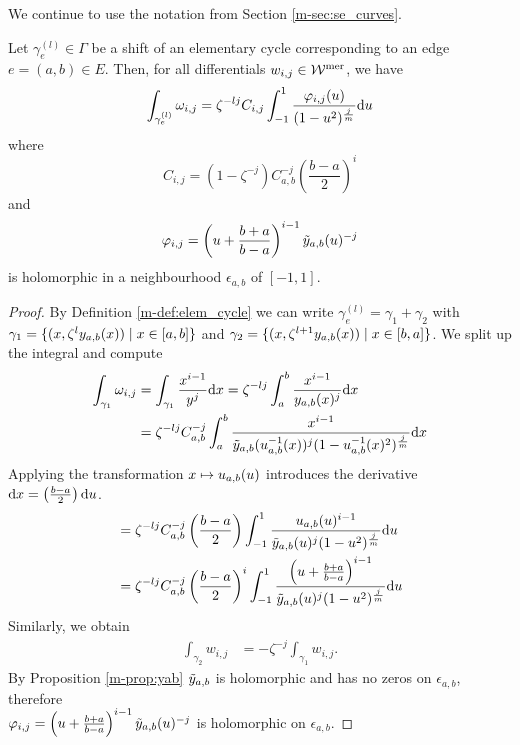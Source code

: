 \documentclass[main.tex]{subfiles}
\begin{document}
  We continue to use the notation from Section \ref{m-sec:se_curves}.

  \begin{thm}\label{thm:periods}
   Let $\gamma_e^{(l)} \in \Gamma$ be a shift of an elementary cycle corresponding
   to an edge $e = (a,b) \in E$. Then, for all differentials $w_{i,j} \in \mathcal{W}^{\text{mer}}$, we have
   \begin{equation}
      \label{eq:thm_periods_1} 
      \int_{\gamma_e^{(l)}} \omega_{i,j}  =  \zeta^{-lj} C_{i,j} \int_{-1}^1 \frac{\varphi_{i,j}(u)}{(1-u^2)^{\frac{j}{m}}}  \mathrm d u
   \end{equation}
   where
   \begin{equation}
    C_{i,j}   =  (1-\zeta^{-j}) C_{a,b}^{-j} \left(\frac{b-a}{2}\right)^i
   \end{equation}
   and 
   \begin{equation}
    \varphi_{i,j}  = \left(u+\frac{b+a}{b-a}\right)^{i-1} \tilde{y}_{a,b}(u)^{-j}
   \end{equation}
   is holomorphic in a neighbourhood $\epsilon_{a,b}$ of $[-1,1]$.
  \end{thm}
  \begin{proof}
    By Definition \ref{m-def:elem_cycle} we can write $\gamma_e^{(l)} = \gamma_1 + \gamma_2$ with $\gamma_1 = \{  (x,\zeta^l y_{a,b}(x))  \mid  x \in [a,b]  \}$ and
    $\gamma_2 = \{  (x,\zeta^{l+1}y_{a,b}(x))  \mid  x \in [b,a]  \}$. We split up the integral and compute
    \begin{align}\label{eq:thm_periods_2}
     \int_{\gamma_1} \omega_{i,j}  & =  \int_{\gamma_1} \frac{x^{i-1}}{y^j}  \mathrm d x  =  \zeta^{-lj} \int_a^b \frac{x^{i-1}}{y_{a,b}(x)^j}  \mathrm d x \\  & =
     \zeta^{-lj} C_{a,b}^{-j}   \int_a^b \frac{x^{i-1}}{\tilde{y}_{a,b}(u_{a,b}^{-1}(x))^j (1-u_{a,b}^{-1}(x)^2)^{\frac{j}{m}}}  \mathrm d x
  \end{align}
  Applying the transformation $x \mapsto u_{a,b}(u)$ introduces the derivative $\mathrm d x = \left(\frac{b-a}{2}\right) \mathrm d u$.
  \begin{align}
   & = \zeta^{-lj} C_{a,b}^{-j} \left(\frac{b-a}{2}\right) \int_{-1}^1 \frac{u_{a,b}(u)^{i-1}}{\tilde{y}_{a,b}(u)^j (1-u^2)^{\frac{j}{m}}}  \mathrm d u \\ & = 
    \zeta^{-lj} C_{a,b}^{-j} \left(\frac{b-a}{2}\right)^i \int_{-1}^1 \frac{\left(u+\frac{b+a}{b-a}\right)^{i-1}}{\tilde{y}_{a,b}(u)^j (1-u^2)^{\frac{j}{m}}}  \mathrm d u
  \end{align}
  Similarly, we obtain
  \begin{align}
        \int_{\gamma_2} w_{i,j}  & =  -\zeta^{-j} \int_{\gamma_1} w_{i,j}.
  \end{align}
  By Proposition \ref{m-prop:yab} $\tilde{y}_{a,b}$ is holomorphic and has no zeros on $\epsilon_{a,b}$, therefore \\ $\varphi_{i,j}  = \left(u+\frac{b+a}{b-a}\right)^{i-1} \tilde{y}_{a,b}(u)^{-j}$
  is holomorphic on $\epsilon_{a,b}$.
  \end{proof}
\end{document}
